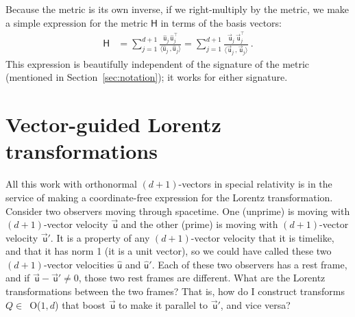 \documentclass{article}
\newcommand{\metric}{\mathsf{H}}
\newcommand\upvec[1]{\!\vec{\,\mathrm{#1}}}
\newcommand{\Lvec}[1]{\upvec{\mathsf{#1}}} %
\newcommand{\Lhat}[1]{\hat{\mathsf{#1}}} %
\newcommand{\inner}[2]{\langle{#1}\,,{#2}\rangle}
\newcommand{\plus}{\!+\!} %
\newcommand{\secref}[1]{Section~\ref{#1}}
\begin{document}
Because the metric is its own inverse, if we right-multiply by the metric, we make a simple expression for the metric $\metric$ in terms of the basis vectors:
\begin{align}
    \metric &= \sum_{j=1}^{d+1} \frac{\Lhat{u}_j\,\Lhat{u}_j^\top}{\inner{\Lhat{u}_j}{\Lhat{u}_j}} = \sum_{j=1}^{d+1} \frac{\Lvec{u}_j\,\Lvec{u}_j^\top}{\inner{\Lvec{u}_j}{\Lvec{u}_j}} ~.
\end{align}
This expression is beautifully independent of the signature of the metric (mentioned in \secref{sec:notation}); it works for either signature.

\section{Vector-guided Lorentz transformations}\label{sec:lt}

All this work with orthonormal $(d\plus1)$-vectors in special relativity is in the service of making a coordinate-free expression for the Lorentz transformation.
Consider two observers moving through spacetime.
One (unprime) is moving with $(d\plus1)$-vector velocity $\Lvec{u}$ and the other (prime) is moving with $(d\plus1)$-vector velocity $\Lvec{u}'$.
It is a property of any $(d\plus1)$-vector velocity that it is timelike, and that it has norm 1 (it is a unit vector), so we could have called these two $(d\plus1)$-vector velocities $\Lhat{u}$ and $\Lhat{u}'$.
Each of these two observers has a rest frame, and if $\Lvec{u}-\Lvec{u}'\neq 0$, those two rest frames are different.
What are the Lorentz transformations between the two frames?
That is, how do I construct transforms $Q\in$~O($1,d$) that boost $\Lvec{u}$ to make it parallel to $\Lvec{u}'$, and vice versa?
\end{document}
